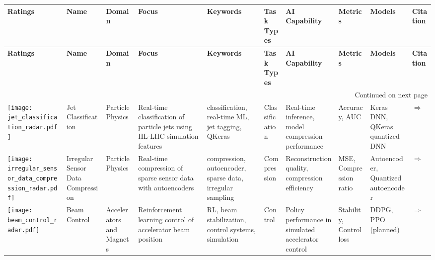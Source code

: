 
\begin{landscape}
{\footnotesize
\begin{longtable}{|p{}|p{}|p{}|p{}|p{}|p{}|p{}|p{}|p{}|p{}|}
\hline
\textbf{Ratings} & \textbf{Name} & \textbf{Domain} & \textbf{Focus} & \textbf{Keywords} & \textbf{Task Types} & \textbf{AI Capability} & \textbf{Metrics} & \textbf{Models} & \textbf{Citation}  \\ \hline
\endfirsthead
\hline
\textbf{Ratings} & \textbf{Name} & \textbf{Domain} & \textbf{Focus} & \textbf{Keywords} & \textbf{Task Types} & \textbf{AI Capability} & \textbf{Metrics} & \textbf{Models} & \textbf{Citation}  \\ \hline
\endhead
\hline
\multicolumn{10}{r}{Continued on next page} \\
\endfoot
\hline
\endlastfoot
\texttt{[image: jet\_classification\_radar.pdf]} & Jet Classification & Particle Physics & Real-time classification of particle jets using HL-LHC simulation features & classification, real-time ML, jet tagging, QKeras & Classification & Real-time inference, model compression performance & Accuracy, AUC & Keras DNN, QKeras quantized DNN & \cite{duarte2022fastml}\href{https://github.com/fastmachinelearning/fastml-science/tree/main/jet-classify}{$\Rightarrow$} \\ \hline
\texttt{[image: irregular\_sensor\_data\_compression\_radar.pdf]} & Irregular Sensor Data Compression & Particle Physics & Real-time compression of sparse sensor data with autoencoders & compression, autoencoder, sparse data, irregular sampling & Compression & Reconstruction quality, compression efficiency & MSE, Compression ratio & Autoencoder, Quantized autoencoder & \cite{duarte2022fastmlsciencebenchmarksaccelerating}\href{https://github.com/fastmachinelearning/fastml-science/tree/main/sensor-data-compression}{$\Rightarrow$} \\ \hline
\texttt{[image: beam\_control\_radar.pdf]} & Beam Control & Accelerators and Magnets & Reinforcement learning control of accelerator beam position & RL, beam stabilization, control systems, simulation & Control & Policy performance in simulated accelerator control & Stability, Control loss & DDPG, PPO (planned) & \cite{duarte2022fastmlsciencebenchmarksaccelerating,kafkes2021boostrdatasetacceleratorcontrol}\href{https://github.com/fastmachinelearning/fastml-science/tree/main/beam-control}{$\Rightarrow$} \\ \hline

\end{longtable}}
\end{landscape}
